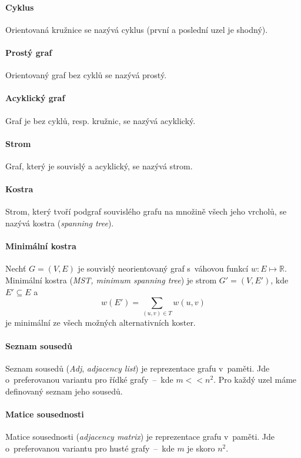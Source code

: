 \paragraph*{Cyklus} Orientovaná kružnice se nazývá cyklus (první a poslední uzel je shodný).

\paragraph*{Prostý graf} Orientovaný graf bez cyklů se nazývá prostý.

\paragraph*{Acyklický graf} Graf je bez cyklů, resp. kružnic, se nazývá acyklický.

\paragraph*{Strom} Graf, který je souvislý a acyklický, se nazývá strom.

\paragraph*{Kostra} Strom, který tvoří podgraf souvislého grafu na množině všech jeho vrcholů, se nazývá kostra (\textit{spanning tree}).

\paragraph*{Minimální kostra} Nechť $G = (V, E)$ je souvislý neorientovaný graf s~váhovou funkcí $w : E \mapsto \mathbb{R}$. Minimální kostra (\textit{MST, minimum spanning tree}) je strom $G' = (V, E')$, kde $E' \subseteq E$ a $$w(E') = \sum_{(u,v) \in T} w(u, v)$$ je minimální ze všech možných alternativních koster.

\paragraph*{Seznam sousedů} Seznam sousedů (\textit{Adj}, \textit{adjacency list}) je reprezentace grafu v~paměti. Jde o~preferovanou variantu pro řídké grafy~--~kde $m << n^2$. Pro každý uzel máme definovaný seznam jeho sousedů.

\paragraph*{Matice sousednosti} Matice sousednosti (\textit{adjacency matrix}) je reprezentace grafu v~paměti. Jde o~preferovanou variantu pro husté grafy~--~kde $m$ je skoro $n^2$.

